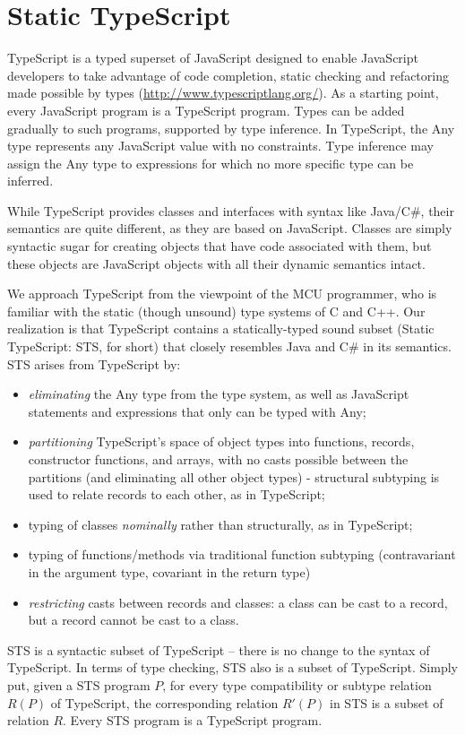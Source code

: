 \section{Static TypeScript}
\label{sec:sts}

TypeScript is a typed superset of JavaScript designed to enable JavaScript developers to take advantage of code 
completion, static checking and refactoring made possible by types (\url{http://www.typescriptlang.org/}). 
As a starting point, every JavaScript program is a TypeScript program.  Types can be added gradually to such programs, 
supported by type inference. 
In TypeScript, the Any type 
represents any JavaScript value with no constraints. Type inference may assign the Any type to expressions for which 
no more specific type can be inferred.

While TypeScript provides classes and interfaces with syntax like Java/C\#, their semantics
are quite different, as they are based on JavaScript.  Classes are simply syntactic sugar for creating objects that
have code associated with them, but these objects are JavaScript objects with all their dynamic semantics intact. 

We approach TypeScript from the viewpoint of the MCU programmer, who is 
familiar with the static (though unsound) type systems of C and C++. Our realization is that TypeScript contains a
statically-typed sound subset (Static TypeScript: STS, for short) that closely resembles Java and C\# in its semantics.
STS arises from TypeScript by:
\begin{itemize}
\item \emph{eliminating} the Any type from the type system, as well as JavaScript statements
and expressions that only can be typed with Any;
\item \emph{partitioning} TypeScript's space of object types into functions, records, constructor functions, and arrays, with no casts 
    possible between the partitions (and eliminating all other object types) - structural subtyping is used to relate records 
    to each other, as in TypeScript;
\item typing of classes \emph{nominally} rather than structurally, as in TypeScript;
\item typing of functions/methods via traditional function subtyping (contravariant 
    in the argument type, covariant in the return type)
\item \emph{restricting} casts between records and classes: a class can be cast to a record, but a record cannot be cast to a class.
\end{itemize}
STS is a syntactic subset of TypeScript -- there is no change to the syntax of TypeScript.
In terms of type checking, STS also is a subset of TypeScript. Simply put, given a STS program $P$,
for every type compatibility or subtype relation $R(P)$ of TypeScript, the corresponding relation $R'(P)$ in STS
is a subset of relation $R$. Every STS program is a TypeScript program. 


